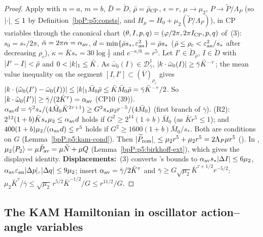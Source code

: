 \begin{proof}
\label{stepP:p5:av-dict} Apply  with $n=a$, $m=b$, $\bar D=\check D$, $\bar\rho=\bar\rho_{\rm CP}$, $\epsilon=r$, $\mu\to\mu_2$, $P\to\tilde P/\Lambda_P$ (so $\lvert \cdot\rvert_{,}\le1$ by Definition~\ref{bpP:p5:consts}, and $H_\mu=H_0+\mu_2(\tilde P/\Lambda_P)$), in CP variables through the canonical chart $(\theta,I,p,q)=(\varphi/2\pi,2\pi I_{\rm CP},p,q)$ of \,(3): $s_0=s_*/2\pi$, $\bar\alpha=2\pi\alpha=\alpha_{\rm av}$, $d=\min\{\bar\rho s_*,\varepsilon_{\rm an}^2\}=\bar\rho s_*$ ($\bar\rho\le\rho_c<\varepsilon_{\rm an}^2/s_*$ after decreasing $\rho_c$), $\kappa=\bar Ks_*=30\log\frac1r$ and $e^{-\kappa/6}=r^5$.
\label{stepP:p5:av-R1} Let $I'\in\check D_{\bar\rho}$, $I\in\check D$ with $\lvert I'-I\rvert<\bar\rho$ and $0<\lvert k\rvert_1\le\bar K$. As $\bar\omega_0(I)\in\mathcal D^1_{\bar\gamma}$, $\lvert k\cdot\bar\omega_0(I)\rvert\ge\bar\gamma\bar K^{-\tau}$; the mean value inequality on the segment $[I,I']\subset(\overline V)_{\rho_c}$ gives $\lvert k\cdot(\tilde\omega_0(I')-\bar\omega_0(I))\rvert\le\lvert k\rvert_1\bar M_0\bar\rho\le\bar K\bar M_0\bar\rho=\bar\gamma\bar K^{-\tau}/2$. So $\lvert k\cdot\tilde\omega_0(I')\rvert\ge\bar\gamma/(2\bar K^\tau)=\alpha_{\rm av}$ (CP10 (39)).
\label{stepP:p5:av-R2} $\alpha_{\rm av}d=\bar\gamma^2s_*/(4\bar M_0\bar K^{2\tau+1})\ge G^2s_*\mu_2r^{-5}/(4\bar M_0)$ (first branch of $\bar\gamma$). (R2): $2^{12}(1+b)\bar Ks_*\mu_2\le\alpha_{\rm av}d$ holds if $G^2\ge2^{14}(1+b)\bar M_0$ (as $\bar Kr^5\le1$); and $400(1+b)\mu_2/(\alpha_{\rm av}d)\le r^5$ holds if $G^2\ge1600(1+b)\bar M_0/s_*$. Both are conditions on $G$ (Lemma~\ref{bpP:p5:kam-cond}). Then $\lvert \widetilde P_{\rm rem}\rvert_{,}\le\mu_2r^5+\mu_2r^5=2\Lambda_P\mu r^5$ ().
\label{stepP:p5:av-id} In , $\mu_2\langle P_2\rangle=\mu\tilde P_{\rm av}=\mu\tilde N+\mu Q$ (Lemma~\ref{bpP:p5:birkhoff-ext}), which gives the displayed identity. \textbf{Displacements:} \,(3) converts 's bounds to $\alpha_{\rm av}s_*\lvert \Delta I\rvert\le6\mu_2$, $\alpha_{\rm av}\varepsilon_{\rm an}\lvert \Delta p\rvert,\lvert \Delta q\rvert\le9\mu_2$; insert $\alpha_{\rm av}=\bar\gamma/2\bar K^\tau$ and $\bar\gamma\ge G\sqrt{\mu_2}\bar K^{\tau+1/2}r^{-5/2}$: $\mu_2\bar K^\tau/\bar\gamma\le\sqrt{\mu_2}\,r^{5/2}\bar K^{-1/2}/G\le r^{11/2}/G$.
\end{proof}

\subsection{The KAM Hamiltonian in oscillator action--angle variables}\label{bpP:p5:kam-ham}

